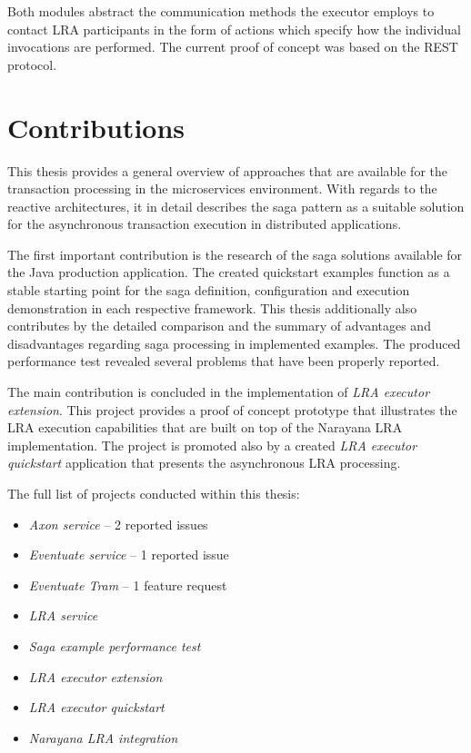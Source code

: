 \documentclass[oneside,
  digital, %
  table,   %
  lof,     %
  lot,     %
]{fithesis3}
\begin{document}
Both modules abstract the communication methods the executor employs to contact LRA participants in the form of actions which specify how the individual invocations are performed. The current proof of concept was based on the REST protocol.

\section{Contributions}

This thesis provides a general overview of approaches that are available for the transaction processing in the microservices environment. With regards to the reactive architectures, it in detail describes the saga pattern as a suitable solution for the asynchronous transaction execution in distributed applications.

The first important contribution is the research of the saga solutions available for the Java production application. The created quickstart examples function as a stable starting point for the saga definition, configuration and execution demonstration in each respective framework. This thesis additionally also contributes by the detailed comparison and the summary of advantages and disadvantages regarding saga processing in implemented examples. The produced performance test revealed several problems that have been properly reported.

The main contribution is concluded in the implementation of \textit{LRA executor extension}. This project provides a proof of concept prototype that illustrates the LRA execution capabilities that are built on top of the Narayana LRA implementation. The project is promoted also by a created \textit{LRA executor quickstart} application that presents the asynchronous LRA processing.

The full list of projects conducted within this thesis:

\begin{itemize}
    \item \textit{Axon service} -- 2 reported issues
    
    \item \textit{Eventuate service} -- 1 reported issue
    
    \item \textit{Eventuate Tram} -- 1 feature request
    
    \item \textit{LRA service}
    
    \item \textit{Saga example performance test}
    
    \item \textit{LRA executor extension}
    
    \item \textit{LRA executor quickstart}
    
    \item \textit{Narayana LRA integration}
\end{itemize}
\end{document}
